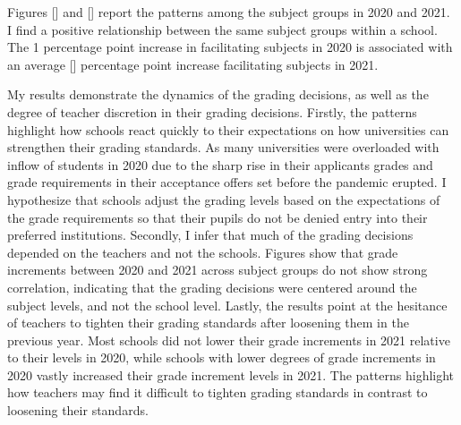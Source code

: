 Figures [] and [] report the patterns among the subject groups in 2020 and 2021. I find a positive relationship between the same subject groups within a school. The 1 percentage point increase in facilitating subjects in 2020 is associated with an average [] percentage point increase facilitating subjects in 2021. 

My results demonstrate the dynamics of the grading decisions, as well as the degree of teacher discretion in their grading decisions. Firstly, the patterns highlight how schools react quickly to their expectations on how universities can strengthen their grading standards. As many universities were overloaded with inflow of students in 2020 due to the sharp rise in their applicants grades and grade requirements in their acceptance offers set before the pandemic erupted. I hypothesize that schools adjust the grading levels based on the expectations of the grade requirements so that their pupils do not be denied entry into their preferred institutions. Secondly, I infer that much of the grading decisions depended on the teachers and not the schools. Figures show that grade increments between 2020 and 2021 across subject groups do not show strong correlation, indicating that the grading decisions were centered around the subject levels, and not the school level. Lastly, the results point at the hesitance of teachers to tighten their grading standards after loosening them in the previous year. Most schools did not lower their grade increments in 2021 relative to their levels in 2020, while schools with lower degrees of grade increments in 2020 vastly increased their grade increment levels in 2021. The patterns highlight how teachers may find it difficult to tighten grading standards in contrast to loosening their standards. 